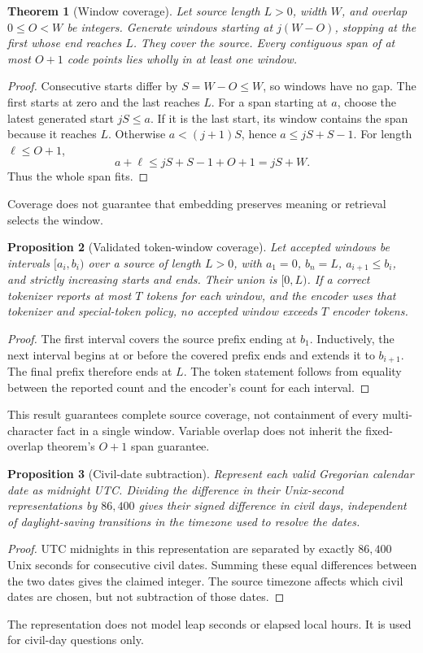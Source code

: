 \documentclass[11pt]{article}
\newtheorem{theorem}{Theorem}
\newtheorem{proposition}[theorem]{Proposition}
\begin{document}
\begin{theorem}[Window coverage]
Let source length $L>0$, width $W$, and overlap $0\leq O<W$ be integers. Generate windows starting at $j(W-O)$, stopping at the first whose end reaches $L$. They cover the source. Every contiguous span of at most $O+1$ code points lies wholly in at least one window.
\end{theorem}
\begin{proof}
Consecutive starts differ by $S=W-O\leq W$, so windows have no gap. The first starts at zero and the last reaches $L$. For a span starting at $a$, choose the latest generated start $jS\leq a$. If it is the last start, its window contains the span because it reaches $L$. Otherwise $a<(j+1)S$, hence $a\leq jS+S-1$. For length $\ell\leq O+1$,
\[
 a+\ell\leq jS+S-1+O+1=jS+W.
\]
Thus the whole span fits.
\end{proof}
Coverage does not guarantee that embedding preserves meaning or retrieval selects the window.


\begin{proposition}[Validated token-window coverage]
Let accepted windows be intervals $[a_i,b_i)$ over a source of length $L>0$, with $a_1=0$, $b_n=L$, $a_{i+1}\leq b_i$, and strictly increasing starts and ends. Their union is $[0,L)$. If a correct tokenizer reports at most $T$ tokens for each window, and the encoder uses that tokenizer and special-token policy, no accepted window exceeds $T$ encoder tokens.
\end{proposition}
\begin{proof}
The first interval covers the source prefix ending at $b_1$. Inductively, the next interval begins at or before the covered prefix ends and extends it to $b_{i+1}$. The final prefix therefore ends at $L$. The token statement follows from equality between the reported count and the encoder's count for each interval.
\end{proof}
This result guarantees complete source coverage, not containment of every multi-character fact in a single window. Variable overlap does not inherit the fixed-overlap theorem's $O+1$ span guarantee.

\begin{proposition}[Civil-date subtraction]
Represent each valid Gregorian calendar date as midnight UTC. Dividing the difference in their Unix-second representations by $86{,}400$ gives their signed difference in civil days, independent of daylight-saving transitions in the timezone used to resolve the dates.
\end{proposition}
\begin{proof}
UTC midnights in this representation are separated by exactly $86{,}400$ Unix seconds for consecutive civil dates. Summing these equal differences between the two dates gives the claimed integer. The source timezone affects which civil dates are chosen, but not subtraction of those dates.
\end{proof}
The representation does not model leap seconds or elapsed local hours. It is used for civil-day questions only.
\end{document}
